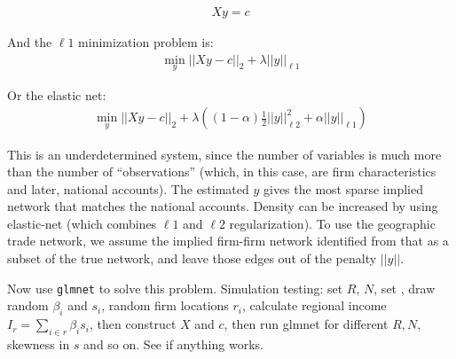 \documentclass[11pt]{article}
\begin{document}
\begin{gather}
X y = c
\end{gather}


And the $\ell 1$ minimization problem is:
\begin{gather}
\min_y || X y - c||_2 + \lambda || y ||_{\ell 1}
\end{gather}

Or the elastic net:
\begin{gather}
\min_y || X y - c||_2 + \lambda \left( (1-\alpha) \frac{1}{2} || y ||^2_{\ell 2} + \alpha || y ||_{\ell 1} \right)
\end{gather}


This is an underdetermined system, since the number of variables is much more than the number of ``observations'' (which, in this case, are firm characteristics and later, national accounts). The estimated $y$ gives the most sparse implied network that matches the national accounts. Density can be increased by using elastic-net (which combines $\ell 1$ and $\ell 2$ regularization).  To use the geographic trade network, we assume the implied firm-firm network identified from that as a subset of the true network, and leave those edges out of the penalty $||y||$.

Now use \texttt{glmnet} to solve this problem. Simulation testing: set $R$, $N$, set , draw random $\beta_i$ and $s_i$, random firm locations $r_i$, calculate regional income $I_r = \sum_{i \in r} \beta_i s_i$, then construct $X$ and $c$, then run glmnet for different $R,N$, skewness in $s$ and so on. See if anything works.
\end{document}
